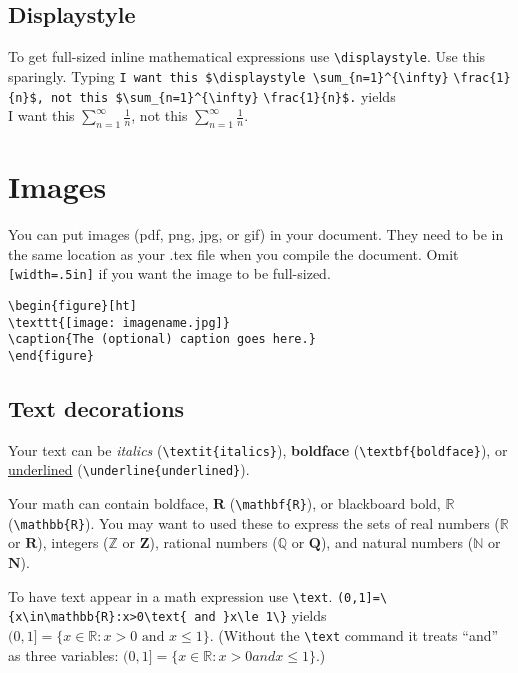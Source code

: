 \begin{multicols}{3}
\subsection{Displaystyle} 
To get full-sized inline mathematical expressions  use  \verb!\displaystyle!. Use this sparingly. Typing \verb!I want this $\displaystyle \sum_{n=1}^{\infty}! \verb!\frac{1}{n}$, not this $\sum_{n=1}^{\infty}! \verb!\frac{1}{n}$.! yields\\ I want  this $\displaystyle \sum_{n=1}^{\infty}\frac{1}{n}$, not this $\sum_{n=1}^{\infty}\frac{1}{n}.$


\section{Images}

You can put images (pdf, png, jpg, or gif) in your document. They need to be in the same location as your .tex file when you compile the document. Omit   \verb![width=.5in]! if you want the image to be full-sized.

\verb!\begin{figure}[ht]!\\
\verb!\texttt{[image: imagename.jpg]}!\\
\verb!\caption{The (optional) caption goes here.}!\\
\verb!\end{figure}!

\subsection{Text decorations}

Your text can be \textit{italics} (\verb!\textit{italics}!), \textbf{boldface} (\verb!\textbf{boldface}!), or \underline{underlined} (\verb!\underline{underlined}!).

Your math can contain boldface, $\mathbf{R}$ (\verb!\mathbf{R}!), or blackboard bold, $\mathbb{R}$ (\verb!\mathbb{R}!). You may want to used these to express the sets of real numbers ($\mathbb{R}$ or $\mathbf{R}$), integers ($\mathbb{Z}$ or $\mathbf{Z}$), rational numbers ($\mathbb{Q}$ or $\mathbf{Q}$), and natural numbers ($\mathbb{N}$ or $\mathbf{N}$).

To have text appear in a math expression use \verb!\text!. \verb!(0,1]=\{x\in\mathbb{R}:x>0\text{ and }x\le 1\}! yields $(0,1]=\{x\in\mathbb{R}:x>0\text{ and }x\le 1\}$. (Without the \verb!\text! command it treats ``and'' as three variables: $(0,1]=\{x\in\mathbb{R}:x>0 and x\le 1\}$.)




\end{multicols}
